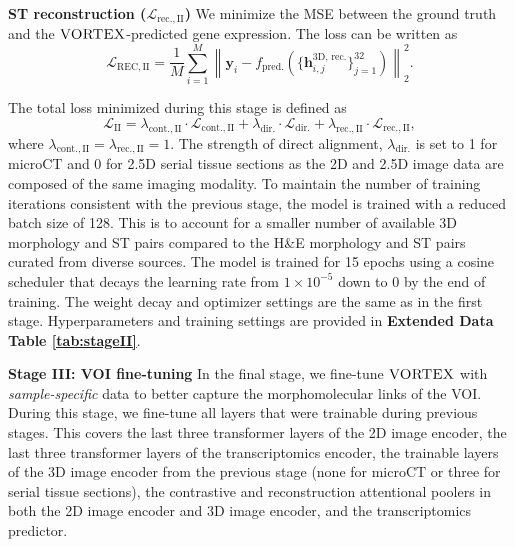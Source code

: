 \textbf{ST reconstruction ($\mathcal{L}_{\text{rec.},\mathrm{II}}$)} We minimize the MSE between the ground truth and the $\textsc{VORTEX}$-predicted gene expression. The loss can be written as
\begin{equation}
\mathcal{L}_{\text{REC}, \mathrm{II}} = \frac{1}{M} \sum_{i=1}^{M} \left\| \mathbf{y}_i - f_{\text{pred.}}\left(\{\mathbf{h}_{i,j}^{\text{3D, rec.}}\}_{j=1}^{32}\right) \right\|_2^2.
\end{equation}

The total loss minimized during this stage is defined as
\begin{equation}
    \mathcal{L}_{\mathrm{II}} = \lambda_{\text{cont.},\mathrm{II}}\cdot\mathcal{L}_{\text{cont.},\mathrm{II}} + 
\lambda_{\text{dir.}}\cdot\mathcal{L}_{\text{dir.}} +
\lambda_{\text{rec.},\mathrm{II}}\cdot\mathcal{L}_{\text{rec.}, \mathrm{II}},
\end{equation}
where $\lambda_{\text{cont.},\mathrm{II}}=\lambda_{\text{rec.},\mathrm{II}}=1$. The strength of direct alignment, $\lambda_{\text{dir.}}$ is set to 1 for microCT and 0 for 2.5D serial tissue sections as the 2D and 2.5D image data are composed of the same imaging modality. 
To maintain the number of training iterations consistent with the previous stage, the model is trained with a reduced batch size of 128. This is to account for a smaller number of available 3D morphology and ST pairs compared to the H\&E morphology and ST pairs curated from diverse sources. The model is trained for 15 epochs using a cosine scheduler that decays the learning rate from $1 \times 10^{-5}$ down to 0 by the end of training. The weight decay and optimizer settings are the same as in the first stage. Hyperparameters and training settings are provided in \textbf{Extended Data Table \ref{tab:stageII}}.


\noindent\textbf{Stage III: VOI fine-tuning}
In the final stage, we fine-tune $\textsc{VORTEX}$ with \textit{sample-specific} data to better capture the morphomolecular links of the VOI. During this stage, we fine-tune all layers that were trainable during previous stages. This covers the last three transformer layers of the 2D image encoder, the last three transformer layers of the transcriptomics encoder, the trainable layers of the 3D image encoder from the previous stage (none for microCT or three for serial tissue sections), the contrastive and reconstruction attentional poolers in both the 2D image encoder and 3D image encoder, and the transcriptomics predictor. 

